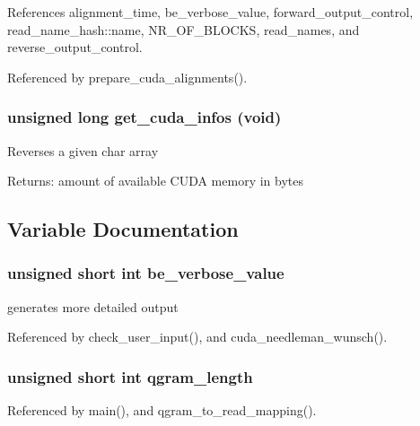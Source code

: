 References alignment\_\-time, be\_\-verbose\_\-value, forward\_\-output\_\-control, read\_\-name\_\-hash::name, NR\_\-OF\_\-BLOCKS, read\_\-names, and reverse\_\-output\_\-control.

Referenced by prepare\_\-cuda\_\-alignments().
\subsubsection[{get\_\-cuda\_\-infos}]{\setlength{\rightskip}{0pt plus 5cm}unsigned long get\_\-cuda\_\-infos (void)}\label{cuda-functions_8h_b90f77b7522c839cc4e828829764091a}


Reverses a given char array \begin{Desc}
\item[Returns:]amount of available CUDA memory in bytes \end{Desc}


\subsection{Variable Documentation}
\subsubsection[{be\_\-verbose\_\-value}]{\setlength{\rightskip}{0pt plus 5cm}unsigned short int {\bf be\_\-verbose\_\-value}}\label{cuda-functions_8h_e87ca0c58972a2f744b0fcbb8387cf2e}


generates more detailed output 

Referenced by check\_\-user\_\-input(), and cuda\_\-needleman\_\-wunsch().
\subsubsection[{qgram\_\-length}]{\setlength{\rightskip}{0pt plus 5cm}unsigned short int {\bf qgram\_\-length}}\label{cuda-functions_8h_dca41ef662c3741c7e78c3afc8fb52ec}




Referenced by main(), and qgram\_\-to\_\-read\_\-mapping().

